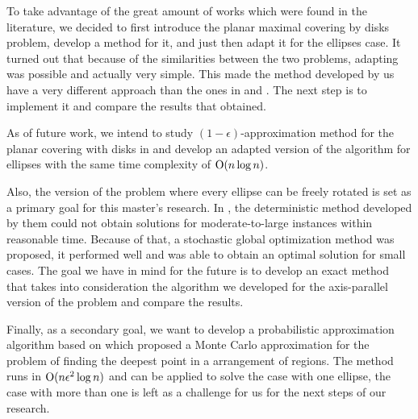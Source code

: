 To take advantage of the great amount of works which were found in the literature,
 we decided to first introduce the planar maximal covering by disks problem, develop a method for it, and just then adapt it for the ellipses case. It turned out that because of the similarities between the two problems, adapting was possible and actually very simple. This made the method developed by us have a very different approach than the ones in \cite{andreta} and \cite{canbolat}. The next step is to implement it and compare the results that \cite{andreta} obtained.
 
As of future work, we intend to study $(1-\epsilon)$-approximation method for the planar covering with disks in \cite{cabello:2006} and develop an adapted version of the algorithm for ellipses with the same time complexity of $\mathrm{O}(n\log{n})$.

Also, the version of the problem where every ellipse can be freely rotated is set as a primary goal for this master's research. In \cite{andreta}, the deterministic method developed by them could not obtain solutions for moderate-to-large instances within reasonable time. Because of that, a stochastic global optimization method was proposed, it performed well and was able to obtain an optimal solution for small cases. The goal we have in mind for the future is to develop an exact method that takes into consideration the algorithm we developed for the axis-parallel version of the problem and compare the results.

Finally, as a secondary goal, we want to develop a probabilistic approximation algorithm based on \cite{aronov:2008} which proposed a Monte Carlo approximation for the problem of finding the deepest point in a arrangement of regions. The method runs in $\mathrm{O}(n\epsilon^2\log{n})$ and can be applied to solve the case with one ellipse, the case with more than one is left as a challenge for us for the next steps of our research.


